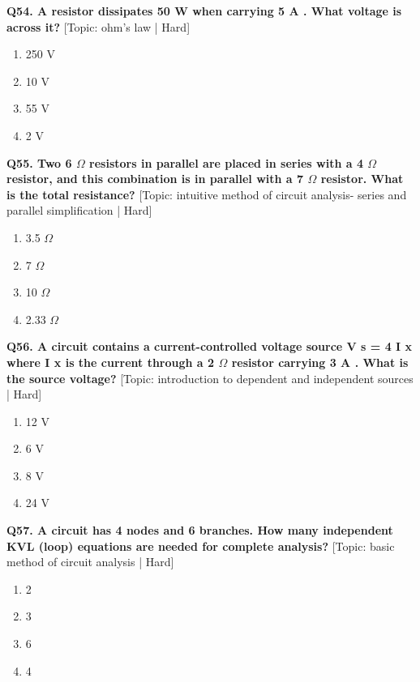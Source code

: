\noindent\textbf{Q54. A resistor dissipates 50 W when carrying 5 A . What voltage is across it?} \hfill [Topic: ohm's law | Hard]
\begin{enumerate}[label=(\alph*),topsep=2pt,itemsep=1pt,partopsep=0pt,parsep=0pt]
    \item {250 V}
    \item {10 V}
    \item {55 V}
    \item {2 V}
\end{enumerate}
\vspace{2mm}

\noindent\textbf{Q55. Two 6 $\Omega$ resistors in parallel are placed in series with a 4 $\Omega$ resistor, and this combination is in parallel with a 7 $\Omega$ resistor. What is the total resistance?} \hfill [Topic: intuitive method of circuit analysis- series and parallel simplification | Hard]
\begin{enumerate}[label=(\alph*),topsep=2pt,itemsep=1pt,partopsep=0pt,parsep=0pt]
    \item {3.5 $\Omega$}
    \item {7 $\Omega$}
    \item {10 $\Omega$}
    \item {2.33 $\Omega$}
\end{enumerate}
\vspace{2mm}

\noindent\textbf{Q56. A circuit contains a current-controlled voltage source V s = 4 I x where I x is the current through a 2 $\Omega$ resistor carrying 3 A . What is the source voltage?} \hfill [Topic: introduction to dependent and independent sources | Hard]
\begin{enumerate}[label=(\alph*),topsep=2pt,itemsep=1pt,partopsep=0pt,parsep=0pt]
    \item {12 V}
    \item {6 V}
    \item {8 V}
    \item {24 V}
\end{enumerate}
\vspace{2mm}

\noindent\textbf{Q57. A circuit has 4 nodes and 6 branches. How many independent KVL (loop) equations are needed for complete analysis?} \hfill [Topic: basic method of circuit analysis | Hard]
\begin{enumerate}[label=(\alph*),topsep=2pt,itemsep=1pt,partopsep=0pt,parsep=0pt]
    \item {2}
    \item {3}
    \item {6}
    \item {4}
\end{enumerate}
\vspace{2mm}

